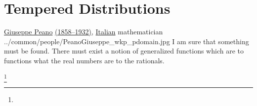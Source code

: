 \section{Tempered Distributions}
\qboxnps
  {\href{http://en.wikipedia.org/wiki/Giuseppe_Peano}{Giuseppe Peano}
   \href{http://www-history.mcs.st-andrews.ac.uk/Timelines/TimelineF.html}{(1858--1932)},
   \href{http://www-history.mcs.st-andrews.ac.uk/BirthplaceMaps/Places/Italy.html}{Italian} mathematician\footnotemark}
  {../common/people/PeanoGiuseppe_wkp_pdomain.jpg}
  {I am sure that something must be found.
   There must exist a notion of generalized functions which are to functions what the real numbers
   are to the rationals.}

\begin{definition}
\footnote{
  }
\label{def:test_function}
\label{def:schwartzclass}
\end{definition}

